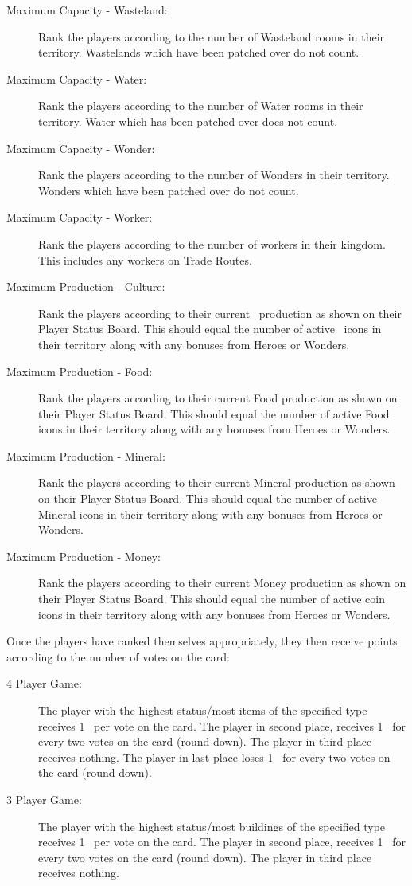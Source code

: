 \documentclass[10pt,twocolumn]{article}
\begin{document}
\begin{description}
\item[Maximum Capacity - Wasteland:] Rank the players according to the number of Wasteland rooms in their territory. Wastelands which have been patched over do not count.
\item[Maximum Capacity - Water:] Rank the players according to the number of Water rooms in their territory. Water which has been patched over does not count.
\item[Maximum Capacity - Wonder:] Rank the players according to the number of Wonders in their territory. Wonders which have been patched over do not count.
\item[Maximum Capacity - Worker:] Rank the players according to the number of workers in their kingdom. This includes any workers on Trade Routes.
\item[Maximum Production - Culture:] Rank the players according to their current \victorypoint\ production as shown on their Player Status Board. This should equal the number of active \victorypoint\ icons in their territory along with any bonuses from Heroes or Wonders.
\item[Maximum Production - Food:] Rank the players according to their current Food production as shown on their Player Status Board. This should equal the number of active Food icons in their territory along with any bonuses from Heroes or Wonders.
\item[Maximum Production - Mineral:] Rank the players according to their current Mineral production as shown on their Player Status Board. This should equal the number of active Mineral icons in their territory along with any bonuses from Heroes or Wonders.
\item[Maximum Production - Money:] Rank the players according to their current Money production as shown on their Player Status Board. This should equal the number of active coin icons in their territory along with any bonuses from Heroes or Wonders.
\end{description}
Once the players have ranked themselves appropriately, they then receive points according to the number of votes on the card:

\begin{description}
\item[4 Player Game:] The player with the highest status/most items of the specified type receives 1 \vp\ per vote on the card. The player in second place, receives 1 \vp\ for every two votes on the card (round down). The player in third place receives nothing. The player in last place loses 1 \vp\ for every two votes on the card (round down).

\item[3 Player Game:] The player with the highest status/most buildings of the specified type receives 1 \vp\ per vote on the card. The player in second place, receives 1 \vp\ for every two votes on the card (round down). The player in third place receives nothing.
\end{description}
\end{document}
